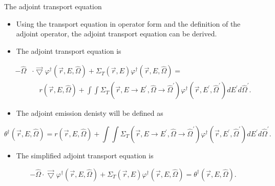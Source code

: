 \documentclass{beamer}
\begin{document}
\begin{frame}{The adjoint transport equation}

  \begin{itemize}
    \item Using the transport equation in operator form and the definition
      of the adjoint operator, the adjoint transport equation can be derived.
    \item The adjoint transport equation is 
  \end{itemize}
  \begin{equation*}
    \begin{split}
      -\hat{\Omega} &\cdot \vec{\bigtriangledown} 
      \varphi^{\dagger}(\vec{r},E,\hat{\Omega})
      + \Sigma_T(\vec{r},E) \varphi^{\dagger}(\vec{r},E,\hat{\Omega}) = \\
      & \quad r(\vec{r},E,\hat{\Omega}) +
      \int\int \Sigma_T(\vec{r},E \to E^{'},\hat{\Omega} \to \hat{\Omega}^{'})
      \varphi^{\dagger}(\vec{r},E^{'},\hat{\Omega}^{'}) dE^{'}d\hat{\Omega}^{'}.
    \end{split}
  \end{equation*}

  \begin{itemize}
    \item The adjoint emission denisty will be defined as
  \end{itemize}
  \begin{equation*}
    \theta^{\dagger}(\vec{r},E,\hat{\Omega}) = r(\vec{r},E,\hat{\Omega}) +
    \int\int \Sigma_T(\vec{r},E \to E^{'},\hat{\Omega} \to \hat{\Omega}^{'})
    \varphi^{\dagger}(\vec{r},E^{'},\hat{\Omega}^{'}) dE^{'}d\hat{\Omega}^{'}.
  \end{equation*}

  \begin{itemize}
    \item The simplified adjoint transport equation is
  \end{itemize}
  \begin{equation*}
    -\hat{\Omega} \cdot \vec{\bigtriangledown} 
      \varphi^{\dagger}(\vec{r},E,\hat{\Omega})
      + \Sigma_T(\vec{r},E) \varphi^{\dagger}(\vec{r},E,\hat{\Omega}) =
      \theta^{\dagger}(\vec{r},E,\hat{\Omega}).
  \end{equation*} 
      
\end{frame}
\end{document}
